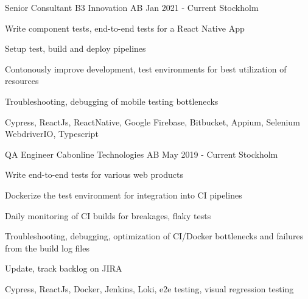 \documentclass[11pt, a4paper]{awesome-cv}
\begin{document}
  \begin{cventries}

    \cventry
    {Senior Consultant}
    {B3 Innovation AB}
    {Jan 2021 - Current}
    {Stockholm}
    {
      \begin{cvitems}
        \item Write component tests, end-to-end tests for a React Native App 
        \item Setup test, build and deploy pipelines
        \item Contonously improve development, test environments for best utilization of resources
        \item Troubleshooting, debugging of mobile testing bottlenecks
        \item Cypress, ReactJs, ReactNative, Google Firebase, Bitbucket, Appium, Selenium WebdriverIO, Typescript
      \end{cvitems}
    }

    \cventry
      {QA Engineer}
      {Cabonline Technologies AB}
      {May 2019 - Current}
      {Stockholm}
      {
        \begin{cvitems}
          \item Write end-to-end tests for various web products
          \item Dockerize the test environment for integration into CI pipelines
          \item Daily monitoring of CI builds for breakages, flaky tests
          \item Troubleshooting, debugging, optimization of CI/Docker bottlenecks and failures from the build log files
          \item Update, track backlog on JIRA
          \item Cypress, ReactJs, Docker, Jenkins, Loki, e2e testing, visual regression testing
        \end{cvitems}
      }


\end{cventries}
\end{document}
